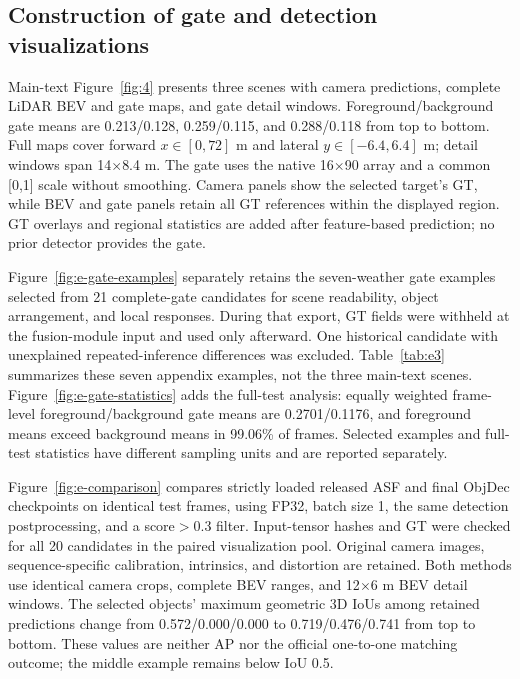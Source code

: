 \subsection{Construction of gate and detection visualizations}
\label{subsec:e3}

Main-text Figure~\ref{fig:4} presents three scenes with camera predictions, complete LiDAR BEV and gate maps, and gate detail windows. Foreground/background gate means are 0.213/0.128, 0.259/0.115, and 0.288/0.118 from top to bottom. Full maps cover forward \(x\in[0,72]\) m and lateral \(y\in[-6.4,6.4]\) m; detail windows span 14\(\times\)8.4 m. The gate uses the native 16\(\times\)90 array and a common [0,1] scale without smoothing. Camera panels show the selected target's GT, while BEV and gate panels retain all GT references within the displayed region. GT overlays and regional statistics are added after feature-based prediction; no prior detector provides the gate.

Figure~\ref{fig:e-gate-examples} separately retains the seven-weather gate examples selected from 21 complete-gate candidates for scene readability, object arrangement, and local responses. During that export, GT fields were withheld at the fusion-module input and used only afterward. One historical candidate with unexplained repeated-inference differences was excluded. Table~\ref{tab:e3} summarizes these seven appendix examples, not the three main-text scenes. Figure~\ref{fig:e-gate-statistics} adds the full-test analysis: equally weighted frame-level foreground/background gate means are 0.2701/0.1176, and foreground means exceed background means in 99.06\% of frames. Selected examples and full-test statistics have different sampling units and are reported separately.

Figure~\ref{fig:e-comparison} compares strictly loaded released ASF and final ObjDec checkpoints on identical test frames, using FP32, batch size 1, the same detection postprocessing, and a score\(>0.3\) filter. Input-tensor hashes and GT were checked for all 20 candidates in the paired visualization pool. Original camera images, sequence-specific calibration, intrinsics, and distortion are retained. Both methods use identical camera crops, complete BEV ranges, and 12\(\times\)6 m BEV detail windows. The selected objects' maximum geometric 3D IoUs among retained predictions change from 0.572/0.000/0.000 to 0.719/0.476/0.741 from top to bottom. These values are neither AP nor the official one-to-one matching outcome; the middle example remains below IoU 0.5.

